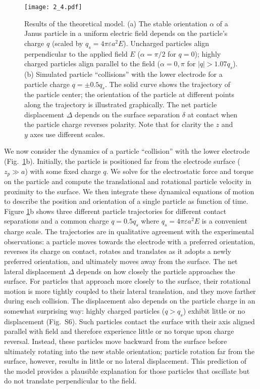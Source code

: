 \begin{figure}[p]
\centering
\texttt{[image: 2\_4.pdf]}
\caption{Results of the theoretical model. (a) The stable orientation $\alpha$ of a Janus particle in a uniform electric field depends on the particle's charge $q$ (scaled by $q_s = 4\pi\varepsilon a^2 E$). Uncharged particles align perpendicular to the applied field $E$ ($\alpha=\pi/2$ for $q=0$); highly charged particles align parallel to the field ($\alpha=0,\pi$ for $|q|>1.07 q_s$). (b) Simulated particle ``collisions'' with the lower electrode for a particle charge $q=\pm0.5q_s$. The solid curve shows the trajectory of the particle center; the orientation of the particle at different points along the trajectory is illustrated graphically. The net particle displacement $\Delta$ depends on the surface separation $\delta$ at contact when the particle charge reverses polarity. Note that for clarity the $z$ and $y$ axes use different scales.}
\label{fig:4}
\end{figure}

We now consider the dynamics of a particle ``collision'' with the lower electrode (Fig.~\ref{fig:4}b). 
Initially, the particle is positioned far from the electrode surface ($z_p\gg a$) with some fixed charge $q$. 
We solve for the electrostatic force and torque on the particle and compute the translational and rotational particle velocity in proximity to the surface.
We then integrate these dynamical equations of motion to describe the position and orientation of a single particle as function of time.
Figure \ref{fig:4}b shows three different particle trajectories for different contact separations and a common charge $q = 0.5 q_s$ where $q_s = 4\pi\varepsilon a^2 E$ is a convenient charge scale.
The trajectories are in qualitative agreement with the experimental observations: a particle moves towards the electrode with a preferred orientation, reverses its charge on contact, rotates and translates as it adopts a newly preferred orientation, and ultimately moves away from the surface.
The net lateral displacement $\Delta$ depends on how closely the particle approaches the surface.
For particles that approach more closely to the surface, their rotational motion is more tightly coupled to their lateral translation, and they move farther during each collision.
The displacement also depends on the particle charge in an somewhat surprising way: highly charged particles ($q > q_s$) exhibit little or no displacement (Fig.~S6).
Such particles contact the surface with their axis aligned parallel with field and therefore experience little or no torque upon charge reversal.
Instead, these particles move backward from the surface before ultimately rotating into the new stable orientation; particle rotation far from the surface, however, results in little or no lateral displacement.
This prediction of the model provides a plausible explanation for those particles that oscillate but do not translate perpendicular to the field.

